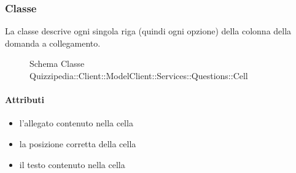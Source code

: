 \subsubsection{Classe }
La classe descrive ogni singola riga (quindi ogni opzione) della colonna della domanda a collegamento.
\begin{figure}[H]
\centering
\noindent{}
\caption[Schema Classe Cell]{Schema Classe Quizzipedia::Client::ModelClient::Services::Questions::Cell}
\end{figure}
\paragraph{Attributi}
\begin{itemize}
\item {}
\newline
l'allegato contenuto nella cella
\item {}
\newline
la posizione corretta della cella
\item {}
\newline
il testo contenuto nella cella
\end{itemize}
